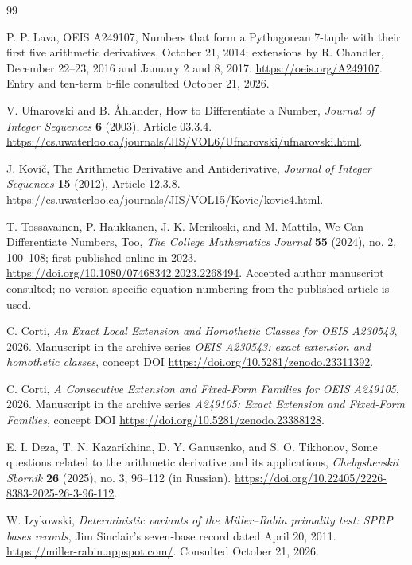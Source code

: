 \documentclass[11pt,a4paper]{article}
\theoremstyle{definition}
\theoremstyle{remark}
\begin{document}
\clearpage
\begin{thebibliography}{99}

P. P. Lava, OEIS A249107, Numbers that form a Pythagorean 7-tuple with
their first five arithmetic derivatives, October 21, 2014; extensions by
R. Chandler, December 22--23, 2016 and January 2 and 8, 2017.
\url{https://oeis.org/A249107}. Entry and ten-term b-file consulted
October 21, 2026.

V. Ufnarovski and B. \AA hlander, How to Differentiate a Number,
\emph{Journal of Integer Sequences} \textbf{6} (2003), Article 03.3.4.
\url{https://cs.uwaterloo.ca/journals/JIS/VOL6/Ufnarovski/ufnarovski.html}.

J. Kovi\v{c}, The Arithmetic Derivative and Antiderivative,
\emph{Journal of Integer Sequences} \textbf{15} (2012), Article 12.3.8.
\url{https://cs.uwaterloo.ca/journals/JIS/VOL15/Kovic/kovic4.html}.

T. Tossavainen, P. Haukkanen, J. K. Merikoski, and M. Mattila,
We Can Differentiate Numbers, Too, \emph{The College Mathematics Journal}
\textbf{55} (2024), no. 2, 100--108; first published online in 2023.
\url{https://doi.org/10.1080/07468342.2023.2268494}.
Accepted author manuscript consulted; no version-specific equation numbering
from the published article is used.

C. Corti, \emph{An Exact Local Extension and Homothetic Classes for OEIS
A230543}, 2026. Manuscript in the archive series \emph{OEIS A230543:
exact extension and homothetic classes}, concept DOI
\url{https://doi.org/10.5281/zenodo.23311392}.

C. Corti, \emph{A Consecutive Extension and Fixed-Form Families for OEIS
A249105}, 2026. Manuscript in the archive series \emph{A249105: Exact
Extension and Fixed-Form Families}, concept DOI
\url{https://doi.org/10.5281/zenodo.23388128}.

E. I. Deza, T. N. Kazarikhina, D. Y. Ganusenko, and S. O. Tikhonov,
Some questions related to the arithmetic derivative and its applications,
\emph{Chebyshevskii Sbornik} \textbf{26} (2025), no. 3, 96--112 (in Russian).
\url{https://doi.org/10.22405/2226-8383-2025-26-3-96-112}.

W. Izykowski, \emph{Deterministic variants of the Miller--Rabin primality
test: SPRP bases records}, Jim Sinclair's seven-base record dated
April 20, 2011. \url{https://miller-rabin.appspot.com/}.
Consulted October 21, 2026.


\end{thebibliography}
\end{document}
